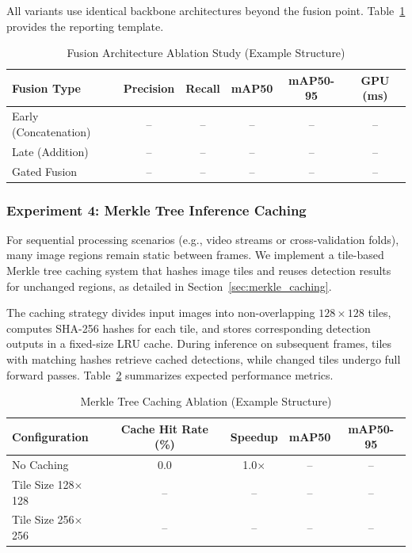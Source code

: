 \documentclass[runningheads]{llncs}
\begin{document}
All variants use identical backbone architectures beyond the fusion point. Table~\ref{tab:fusion_ablation} provides the reporting template.

\begin{table}[h!]
    \centering
    \caption{Fusion Architecture Ablation Study (Example Structure)}
    \label{tab:fusion_ablation}
    \begin{tabular}{lccccc}
        \toprule
        \textbf{Fusion Type} & \textbf{Precision} & \textbf{Recall} & \textbf{mAP50} & \textbf{mAP50-95} & \textbf{GPU (ms)} \\
        \midrule
        Early (Concatenation)  & -- & -- & -- & -- & -- \\
        Late (Addition)        & -- & -- & -- & -- & -- \\
        Gated Fusion           & -- & -- & -- & -- & -- \\
        \bottomrule
    \end{tabular}
\end{table}

\subsubsection{Experiment 4: Merkle Tree Inference Caching}

For sequential processing scenarios (e.g., video streams or cross-validation folds), many image regions remain static between frames. We implement a tile-based Merkle tree caching system that hashes image tiles and reuses detection results for unchanged regions, as detailed in Section~\ref{sec:merkle_caching}.

The caching strategy divides input images into non-overlapping $128 \times 128$ tiles, computes SHA-256 hashes for each tile, and stores corresponding detection outputs in a fixed-size LRU cache. During inference on subsequent frames, tiles with matching hashes retrieve cached detections, while changed tiles undergo full forward passes. Table~\ref{tab:caching_ablation} summarizes expected performance metrics.

\begin{table}[h!]
    \centering
    \caption{Merkle Tree Caching Ablation (Example Structure)}
    \label{tab:caching_ablation}
    \begin{tabular}{lcccc}
        \toprule
        \textbf{Configuration} & \textbf{Cache Hit Rate (\%)} & \textbf{Speedup} & \textbf{mAP50} & \textbf{mAP50-95} \\
        \midrule
        No Caching               & 0.0  & 1.0$\times$ & -- & -- \\
        Tile Size 128$\times$128 & --   & --          & -- & -- \\
        Tile Size 256$\times$256 & --   & --          & -- & -- \\
        \bottomrule
    \end{tabular}
\end{table}
\end{document}
